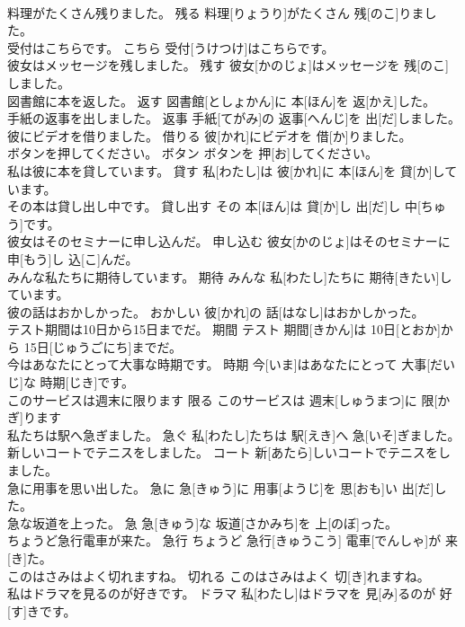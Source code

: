 \documentclass[8pt]{extreport}
\begin{document}
\begin{CJK}{UTF8}{min}
\\	料理がたくさん残りました。	残る	料理[りょうり]がたくさん 残[のこ]りました。	
\\	受付はこちらです。	こちら	受付[うけつけ]はこちらです。	
\\	彼女はメッセージを残しました。	残す	彼女[かのじょ]はメッセージを 残[のこ]しました。	
\\	図書館に本を返した。	返す	図書館[としょかん]に 本[ほん]を 返[かえ]した。	
\\	手紙の返事を出しました。	返事	手紙[てがみ]の 返事[へんじ]を 出[だ]しました。	
\\	彼にビデオを借りました。	借りる	彼[かれ]にビデオを 借[か]りました。	
\\	ボタンを押してください。	ボタン	ボタンを 押[お]してください。	
\\	私は彼に本を貸しています。	貸す	私[わたし]は 彼[かれ]に 本[ほん]を 貸[か]しています。	
\\	その本は貸し出し中です。	貸し出す	その 本[ほん]は 貸[か]し 出[だ]し 中[ちゅう]です。	
\\	彼女はそのセミナーに申し込んだ。	申し込む	彼女[かのじょ]はそのセミナーに 申[もう]し 込[こ]んだ。	
\\	みんな私たちに期待しています。	期待	みんな 私[わたし]たちに 期待[きたい]しています。	
\\	彼の話はおかしかった。	おかしい	彼[かれ]の 話[はなし]はおかしかった。	
\\	テスト期間は10日から15日までだ。	期間	テスト 期間[きかん]は 10日[とおか]から 15日[じゅうごにち]までだ。	
\\	今はあなたにとって大事な時期です。	時期	今[いま]はあなたにとって 大事[だいじ]な 時期[じき]です。	
\\	このサービスは週末に限ります	限る	このサービスは 週末[しゅうまつ]に 限[かぎ]ります	
\\	私たちは駅へ急ぎました。	急ぐ	私[わたし]たちは 駅[えき]へ 急[いそ]ぎました。	
\\	新しいコートでテニスをしました。	コート	新[あたら]しいコートでテニスをしました。	
\\	急に用事を思い出した。	急に	急[きゅう]に 用事[ようじ]を 思[おも]い 出[だ]した。	
\\	急な坂道を上った。	急	急[きゅう]な 坂道[さかみち]を 上[のぼ]った。	
\\	ちょうど急行電車が来た。	急行	ちょうど 急行[きゅうこう] 電車[でんしゃ]が 来[き]た。	
\\	このはさみはよく切れますね。	切れる	このはさみはよく 切[き]れますね。	
\\	私はドラマを見るのが好きです。	ドラマ	私[わたし]はドラマを 見[み]るのが 好[す]きです。	

\end{CJK}
\end{document}
